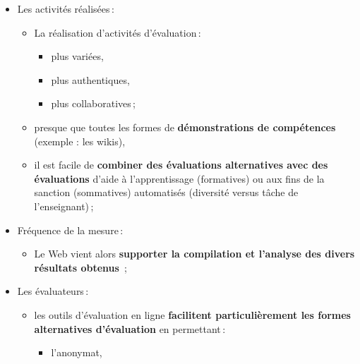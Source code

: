\documentclass{beamer}
\begin{document}
\begin{frame}[allowframebreaks]
\begin {itemize}
\begin {itemize}
								\begin {itemize}
									\item l'automatisation,
									\item la remise immédiate de la rétroaction à l'apprenant,
									\item la réutilisation\,;
								\end{itemize}
							\item elle permet aussi de \textbf{rendre l'évaluation plus captivante} parce qu'elle permet d'y insérer des éléments \textbf{multimédias} ou des \textbf{hyperliens}\,;
						\end{itemize}
					\framebreak 
					\item Les activités réalisées\,:
						\begin {itemize}
							\item La réalisation d'activités d'évaluation\,:
								\begin {itemize}
									\item plus variées,
									\item plus authentiques,
									\item plus collaboratives\,;
								\end{itemize}
							\item presque que toutes les formes de \textbf{démonstrations de compétences} (exemple : les wikis),
							\item il est facile de \textbf{combiner des évaluations alternatives avec des évaluations} d'aide à l'apprentissage (formatives) ou aux fins de la sanction (sommatives) automatisés (diversité versus tâche de l'enseignant)\,;										
						\end{itemize}
					\framebreak 
					\item Fréquence de la mesure\,:
						\begin {itemize}
							\item Le Web vient alors \textbf{supporter la compilation et l'analyse des divers résultats obtenus} \citep{audet2011a} \,;
						\end{itemize}
					\framebreak 
					\item Les évaluateurs\,:
						\begin {itemize}
							\item les outils d'évaluation en ligne \textbf{facilitent particulièrement les formes alternatives d'évaluation} en permettant\,:
								\begin {itemize}
									\item l'anonymat,

\end{itemize}
\end{itemize}
\end{itemize}
\end{frame}
\end{document}
